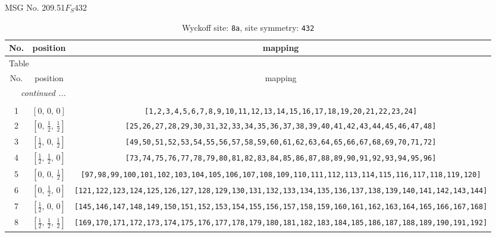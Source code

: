 \documentclass[fleqn,8pt]{jsarticle}
\begin{document}
\setcounter{MaxMatrixCols}{32}

\renewcommand{\tablename}{Table~}
\renewcommand{\figurename}{Figure~}
\begin{center}
\LARGE
MSG No. 209.51\quad$F_{S}432$
\end{center}
\renewcommand{\arraystretch}{1.2}
\begin{longtable}{ccc}
\caption{Wyckoff site: {\tt 8a}, site symmetry: {\tt 432}}
 \\
 \hline \hline
No. & position & mapping \\ \hline \endfirsthead

\multicolumn{2}{l}{\tablename\ \thetable{}} \\
 \hline \hline
No. & position & mapping \\ \hline \endhead

 \hline \hline
\multicolumn{2}{r}{\footnotesize\it continued ...} \\ \endfoot

 \hline \hline
\multicolumn{2}{r}{} \\ \endlastfoot

1 & $\left[ 0,\, 0,\, 0 \right]$ & {\tt [1,2,3,4,5,6,7,8,9,10,11,12,13,14,15,16,17,18,19,20,21,22,23,24]} \\ \hline
2 & $\left[ 0,\, \frac{1}{2},\, \frac{1}{2} \right]$ & {\tt [25,26,27,28,29,30,31,32,33,34,35,36,37,38,39,40,41,42,43,44,45,46,47,48]} \\ \hline
3 & $\left[ \frac{1}{2},\, 0,\, \frac{1}{2} \right]$ & {\tt [49,50,51,52,53,54,55,56,57,58,59,60,61,62,63,64,65,66,67,68,69,70,71,72]} \\ \hline
4 & $\left[ \frac{1}{2},\, \frac{1}{2},\, 0 \right]$ & {\tt [73,74,75,76,77,78,79,80,81,82,83,84,85,86,87,88,89,90,91,92,93,94,95,96]} \\ \hline
5 & $\left[ 0,\, 0,\, \frac{1}{2} \right]$ & {\tt [97,98,99,100,101,102,103,104,105,106,107,108,109,110,111,112,113,114,115,116,117,118,119,120]} \\ \hline
6 & $\left[ 0,\, \frac{1}{2},\, 0 \right]$ & {\tt [121,122,123,124,125,126,127,128,129,130,131,132,133,134,135,136,137,138,139,140,141,142,143,144]} \\ \hline
7 & $\left[ \frac{1}{2},\, 0,\, 0 \right]$ & {\tt [145,146,147,148,149,150,151,152,153,154,155,156,157,158,159,160,161,162,163,164,165,166,167,168]} \\ \hline
8 & $\left[ \frac{1}{2},\, \frac{1}{2},\, \frac{1}{2} \right]$ & {\tt [169,170,171,172,173,174,175,176,177,178,179,180,181,182,183,184,185,186,187,188,189,190,191,192]} \\
\end{longtable}
\end{document}
